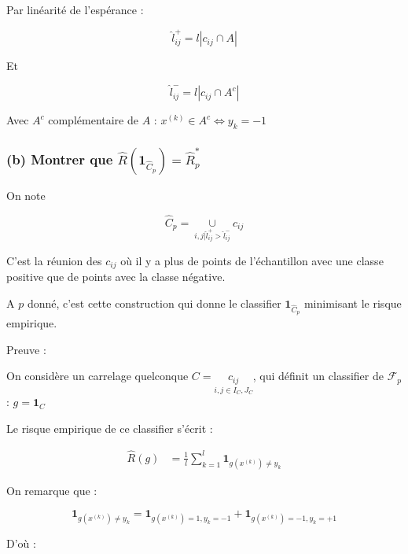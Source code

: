 \documentclass[french]{article}
\begin{document}
Par linéarité de l'espérance :

\[
\hat{l}_{ij}^{+} = l |c_{ij} \cap A|
\]

Et 

\[
\hat{l}_{ij}^{-} = l |c_{ij} \cap A^{c}|
\]

Avec $ A^{c} $ complémentaire de $A$ : $x^{(k)} \in A^{c} \Leftrightarrow y_{k} = -1$

\subsubsection{(b) Montrer que $\hat{R}(\mathbf{1}_{\hat{C}_{p}}) = \hat{R}^{*}_{p}$}

On note 

\[
\hat{C}_{p} = \underset{i,j | \hat{l}_{ij}^{+} > \hat{l}_{ij}^{-}}{\cup} c_{ij}
\]

C'est la réunion des $c_{ij}$ où il y a plus de points de l'échantillon avec une classe positive que de points avec la classe négative.

A $p$ donné, c'est cette construction qui donne le classifier $\mathbf{1}_{\hat{C}_{p}}$ minimisant le risque empirique.

Preuve :

On considère un carrelage quelconque $C = \underset{i,j \in I_{C},J_{C}}{c_{ij}}$, qui définit un classifier de $\mathcal{F}_{p}$ : $ g = \mathbf{1}_{C}$

Le risque empirique de ce classifier s'écrit :

\begin{align}
\hat{R}(g) &= \frac{1}{l}\sum_{k=1}^{l}\mathbf{1}_{g(x^{(k)}) \neq y_{k}}
\end{align}

On remarque que : 

\[
\mathbf{1}_{g(x^{(k)}) \neq y_{k}} = \mathbf{1}_{g(x^{(k)})=1,y_{k}=-1} + \mathbf{1}_{g(x^{(k)})=-1,y_{k}=+1}
\]

D'où :
\end{document}
